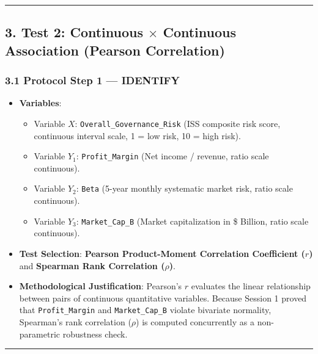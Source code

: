 \documentclass[
]{article}
\providecommand{\tightlist}{%
  \setlength{\itemsep}{0pt}\setlength{\parskip}{0pt}}
\begin{document}
\begin{center}\rule{0.5\linewidth}{0.5pt}\end{center}

\subsection{\texorpdfstring{3. Test 2: Continuous \(\times\) Continuous
Association (Pearson
Correlation)}{3. Test 2: Continuous \textbackslash times Continuous Association (Pearson Correlation)}}\label{test-2-continuous-times-continuous-association-pearson-correlation}

\subsubsection{3.1 Protocol Step 1 ---
IDENTIFY}\label{protocol-step-1-identify-1}

\begin{itemize}
\tightlist
\item
  \textbf{Variables}:

  \begin{itemize}
  \tightlist
  \item
    Variable \(X\): \texttt{Overall\_Governance\_Risk} (ISS composite
    risk score, continuous interval scale, 1 = low risk, 10 = high
    risk).
  \item
    Variable \(Y_1\): \texttt{Profit\_Margin} (Net income / revenue,
    ratio scale continuous).
  \item
    Variable \(Y_2\): \texttt{Beta} (5-year monthly systematic market
    risk, ratio scale continuous).
  \item
    Variable \(Y_3\): \texttt{Market\_Cap\_B} (Market capitalization in
    \$ Billion, ratio scale continuous).
  \end{itemize}
\item
  \textbf{Test Selection}: \textbf{Pearson Product-Moment Correlation
  Coefficient (\(r\))} and \textbf{Spearman Rank Correlation
  (\(\rho\))}.
\item
  \textbf{Methodological Justification}: Pearson's \(r\) evaluates the
  linear relationship between pairs of continuous quantitative
  variables. Because Session 1 proved that \texttt{Profit\_Margin} and
  \texttt{Market\_Cap\_B} violate bivariate normality, Spearman's rank
  correlation (\(\rho\)) is computed concurrently as a non-parametric
  robustness check.
\end{itemize}

\begin{center}\rule{0.5\linewidth}{0.5pt}\end{center}
\end{document}
